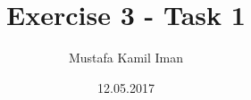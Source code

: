 \documentclass{article}
\title{Exercise 3 - Task 1}
\author{Mustafa Kamil Iman}
\begin{document}
\date{12.05.2017}
\maketitle
\end{document}
